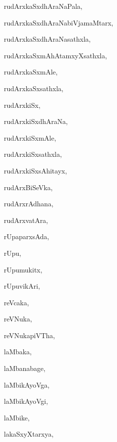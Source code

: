 \begin{multicols}{3}
{\noindent
{rudArxkaSxdhAraNaPala}, \pageref{rudArxkaSxdhAraNaPala}

\noindent
{rudArxkaSxdhAraNabiVjamaMtarx}, \pageref{rudArxkaSxdhAraNabiVjamaMtarx}

\noindent
{rudArxkaSxdhAraNasathxla}, \pageref{rudArxkaSxdhAraNasathxla}

\noindent
{rudArxkaSxmAhAtamxyXsathxla}, \pageref{rudArxkaSxmAhAtamxyXsathxla}

\noindent
{rudArxkaSxmAle}, \pageref{rudArxkaSxmAle}

\noindent
{rudArxkaSxsathxla}, \pageref{rudArxkaSxsathxla}

\noindent
{rudArxkiSx}, \pageref{rudArxkiSx}

\noindent
{rudArxkiSxdhAraNa}, \pageref{rudArxkiSxdhAraNa}

\noindent
{rudArxkiSxmAle}, \pageref{rudArxkiSxmAle}

\noindent
{rudArxkiSxsathxla}, \pageref{rudArxkiSxsathxla}

\noindent
{rudArxkiSxsAhitayx}, \pageref{rudArxkiSxsAhitayx}

\noindent
{rudArxBiSeVka}, \pageref{rudArxBiSeVka}

\noindent
{rudArxrAdhana}, \pageref{rudArxrAdhana}

\noindent
{rudArxvatAra}, \pageref{rudArxvatAra}

\noindent
{rUpaparxsAda}, \pageref{rUpaparxsAda}

\noindent
{rUpu}, \pageref{rUpu}

\noindent
{rUpumukitx}, \pageref{rUpumukitx}

\noindent
{rUpuvikAri}, \pageref{rUpuvikAri}

\noindent
{reVcaka}, \pageref{reVcaka}

\noindent
{reVNuka}, \pageref{reVNuka}

\noindent
{reVNukapiVTha}, \pageref{reVNukapiVTha}

\bigskip
\noindent
{}
\smallskip

\noindent
{laMbaka}, \pageref{laMbaka}

\noindent
{laMbanabage}, \pageref{laMbanabage}

\noindent
{laMbikAyoVga}, \pageref{laMbikAyoVga}

\noindent
{laMbikAyoVgi}, \pageref{laMbikAyoVgi}

\noindent
{laMbike}, \pageref{laMbike}

\noindent
{lakaSxyXtarxya}, \pageref{lakaSxyXtarxya}

}
\end{multicols}
